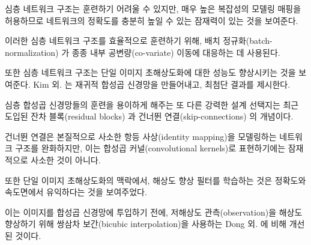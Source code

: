 \documentclass[10pt,twocolumn,letterpaper]{article}
\newcommand{\kor}[1]{#1}
\newcommand{\eng}[1]{}
\begin{document}
\eng{
It was shown that deeper network architectures can be difficult to train but have the potential to substantially increase the network's accuracy as they allow modeling mappings of very high complexity \cite{simonyan2014very,szegedy2015going}.
}\kor{
심층 네트워크 구조는 훈련하기 어려울 수 있지만, 매우 높은 복잡성의 모델링 매핑을 허용하므로 네트워크의 정확도를 충분히 높일 수 있는 잠재력이 있는 것을 보여준다.
} \eng{
To efficiently train these deeper network architectures, batch-normalization \cite{Ioffe2015} is often used to counteract the internal co-variate shift.
}\kor{
이러한 심층 네트워크 구조를 효율적으로 훈련하기 위해, 배치 정규화(batch-normalization) \cite{Ioffe2015}가 종종 내부 공변량(co-variate) 이동에 대응하는 데 사용된다.
} \eng{
Deeper network architectures have also been shown to increase performance for \ac{SISR}, \eg Kim et al. \cite{kim2016deeply} formulate a recursive \ac{CNN} and present state-of-the-art results.
}\kor{
또한 심층 네트워크 구조는 \ac{단일 이미지 초해상도화}에 대한 성능도 향상시키는 것을 보여준다. \eg Kim 외.  \cite{kim2016deeply}는 재귀적 \ac{합성곱 신경망}을 만들어내고, 최첨단 결과를 제시한다.
}
\eng{
Another powerful design choice that eases the training of deep \ac{CNN}s is the recently introduced concept of residual blocks \cite{he2015deep} and skip-connections \cite{he2016identity,kim2016deeply}.
}\kor{
심층 \ac{합성곱 신경망}들의 훈련을 용이하게 해주는 또 다른 강력한 설계 선택지는 최근 도입된 잔차 블록(residual blocks) \cite{he2015deep}과 건너뛴 연결(skip-connections) \cite{he2016identity,kim2016deeply}의 개념이다.
} \eng{
Skip-connections relieve the network architecture of modeling the identity mapping that is trivial in nature, however, potentially non-trivial to represent with convolutional kernels.
}\kor{
건너뛴 연결은 본질적으로 사소한 항등 사상(identity mapping)을 모델링하는 네트워크 구조를 완화하지만, 이는 합성곱 커널(convolutional kernels)로 표현하기에는 잠재적으로 사소한 것이 아니다.
}

\eng{
In the context of \ac{SISR} it was also shown that learning upscaling filters is beneficial in terms of accuracy and speed \cite{dong2016accelerating,Shi2016ESPCN,Wang2016}.
}\kor{
또한 \ac{단일 이미지 초해상도화}의 맥락에서, 해상도 향상 필터를 학습하는 것은 정확도와 속도면에서 유익하다는 것을 보여주었다\cite{dong2016accelerating,Shi2016ESPCN,Wang2016}.
}
\eng{
This is an improvement over Dong et al. \cite{dong2016image} where bicubic interpolation is employed to upscale the LR observation before feeding the image to the \ac{CNN}.
}\kor{
이는 이미지를 \ac{합성곱 신경망}에 투입하기 전에, \ac{저해상도} 관측(observation)을 해상도 향상하기 위해 쌍삼차 보간(bicubic interpolation)을 사용하는 Dong 외. \cite{dong2016image}에 비해 개선된 것이다.
} %
\end{document}
